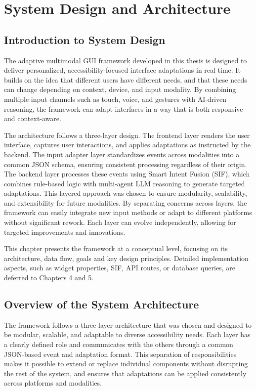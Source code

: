 \chapter{System Design and Architecture}
\label{ch:chapter3}

\section{Introduction to System Design}
The adaptive multimodal GUI framework developed in this thesis is designed to deliver personalized, accessibility-focused interface adaptations in real time. It builds on the idea that different users have different needs, and that these needs can change depending on context, device, and input modality. By combining multiple input channels such as touch, voice, and gestures with AI-driven reasoning, the framework can adapt interfaces in a way that is both responsive and context-aware.

The architecture follows a three-layer design. The frontend layer renders the user interface, captures user interactions, and applies adaptations as instructed by the backend. The input adapter layer standardizes events across modalities into a common JSON schema, ensuring consistent processing regardless of their origin. The backend layer processes these events using Smart Intent Fusion (SIF), which combines rule-based logic with multi-agent LLM reasoning to generate targeted adaptations.
This layered approach was chosen to ensure modularity, scalability, and extensibility for future modalities. By separating concerns across layers, the framework can easily integrate new input methods or adapt to different platforms without significant rework. Each layer can evolve independently, allowing for targeted improvements and innovations.

This chapter presents the framework at a conceptual level, focusing on its architecture, data flow, goals and key design principles. Detailed implementation aspects, such as widget properties, SIF, API routes, or database queries, are deferred to Chapters 4 and 5.

\section{Overview of the System Architecture}
The framework follows a three-layer architecture that was chosen and designed to be modular, scalable, and adaptable to diverse accessibility needs. Each layer has a clearly defined role and communicates with the others through a common JSON-based event and adaptation format. This separation of responsibilities makes it possible to extend or replace individual components without disrupting the rest of the system, and ensures that adaptations can be applied consistently across platforms and modalities.

